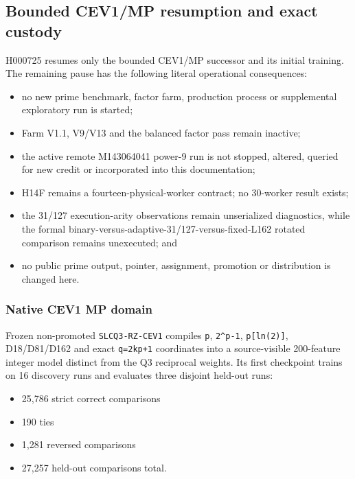 \subsection{Bounded CEV1/MP resumption and exact
custody}\label{viii-ch10-bounded-cev1mp-resumption-and-exact-custody}

H000725 resumes only the bounded CEV1/MP successor and its initial
training. The remaining pause has the following literal operational
consequences:

\begin{itemize}
\tightlist
\item
  no new prime benchmark, factor farm, production process or
  supplemental exploratory run is started;
\item
  Farm V1.1, V9/V13 and the balanced factor pass remain inactive;
\item
  the active remote M143064041 power-9 run is not stopped, altered,
  queried for new credit or incorporated into this documentation;
\item
  H14F remains a fourteen-physical-worker contract; no 30-worker result
  exists;
\item
  the 31/127 execution-arity observations remain unserialized
  diagnostics, while the formal
  binary-versus-adaptive-31/127-versus-fixed-L162 rotated comparison
  remains unexecuted; and
\item
  no public prime output, pointer, assignment, promotion or distribution
  is changed here.
\end{itemize}

\subsubsection{Native CEV1 MP domain}\label{viii-ch10-native-cev1-mp-domain}

Frozen non-promoted \texttt{SLCQ3-RZ-CEV1} compiles \texttt{p},
\texttt{2\^{}p-1}, \texttt{p{[}ln(2){]}}, D18/D81/D162 and exact
\texttt{q=2kp+1} coordinates into a source-visible 200-feature integer
model distinct from the Q3 reciprocal weights. Its first checkpoint
trains on 16 discovery runs and evaluates three disjoint held-out runs:

\begin{itemize}
\tightlist
\item
  25,786 strict correct comparisons
\item
  190 ties
\item
  1,281 reversed comparisons
\item
  27,257 held-out comparisons total.
\end{itemize}

